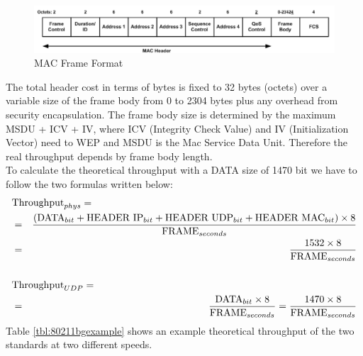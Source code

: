 	\begin{figure}[h!]
		\includegraphics[angle=0, keepaspectratio=true, width=15cm]{../images/mac_header2}
		\caption{MAC Frame Format}
		\label{mac_packet}
	\end{figure}
	
	The total header cost in terms of bytes is fixed to 32 bytes (octets) over a variable size of the frame body from 0 to 2304 bytes plus any overhead from security encapsulation. The frame body size is determined by the maximum MSDU + ICV + IV, where ICV (Integrity Check Value) and IV (Initialization Vector) need to WEP and MSDU is the Mac Service Data Unit. Therefore the real throughput depends by frame body length.\\
	
	
	To calculate the theoretical throughput with a DATA size of 1470 bit we have to follow the two formulas written below:
	\begin{eqnarray*}
		\lefteqn{\textrm{Throughput}_{phys} =} \\
		&=& \frac{ ( \textrm{DATA}_{bit} + \textrm{HEADER IP}_{bit} + \textrm{HEADER UDP}_{bit} + \textrm{HEADER MAC}_{bit} ) \times 8 }{ \textrm{FRAME}_{seconds} } \\
		&=& \frac{ 1532 \times 8 }{  \textrm{FRAME}_{seconds} }
		\\\\
		\lefteqn{\textrm{Throughput}_{UDP} =}\\
		&=& \frac{ \textrm{DATA}_{bit} \times 8 }{ \textrm{FRAME}_{seconds} } = \frac{ 1470 \times 8 }{  \textrm{FRAME}_{seconds} }
	\end{eqnarray*}
	Table \ref{tbl:80211bgexample} shows an example theoretical throughput of the two standards at two different speeds.
	
